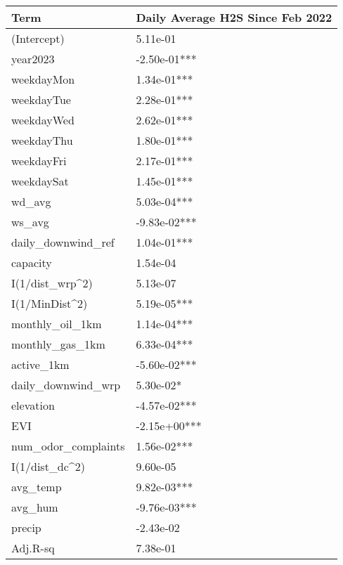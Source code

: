 
\begin{tabular}{l|l}
\hline
Term & Daily Average H2S Since Feb 2022\\
\hline
(Intercept) & 5.11e-01\\
\hline
year2023 & -2.50e-01***\\
\hline
weekdayMon & 1.34e-01***\\
\hline
weekdayTue & 2.28e-01***\\
\hline
weekdayWed & 2.62e-01***\\
\hline
weekdayThu & 1.80e-01***\\
\hline
weekdayFri & 2.17e-01***\\
\hline
weekdaySat & 1.45e-01***\\
\hline
wd\_avg & 5.03e-04***\\
\hline
ws\_avg & -9.83e-02***\\
\hline
daily\_downwind\_ref & 1.04e-01***\\
\hline
capacity & 1.54e-04\\
\hline
I(1/dist\_wrp\textasciicircum{}2) & 5.13e-07\\
\hline
I(1/MinDist\textasciicircum{}2) & 5.19e-05***\\
\hline
monthly\_oil\_1km & 1.14e-04***\\
\hline
monthly\_gas\_1km & 6.33e-04***\\
\hline
active\_1km & -5.60e-02***\\
\hline
daily\_downwind\_wrp & 5.30e-02*\\
\hline
elevation & -4.57e-02***\\
\hline
EVI & -2.15e+00***\\
\hline
num\_odor\_complaints & 1.56e-02***\\
\hline
I(1/dist\_dc\textasciicircum{}2) & 9.60e-05\\
\hline
avg\_temp & 9.82e-03***\\
\hline
avg\_hum & -9.76e-03***\\
\hline
precip & -2.43e-02\\
\hline
Adj.R-sq & 7.38e-01\\
\hline
\end{tabular}
